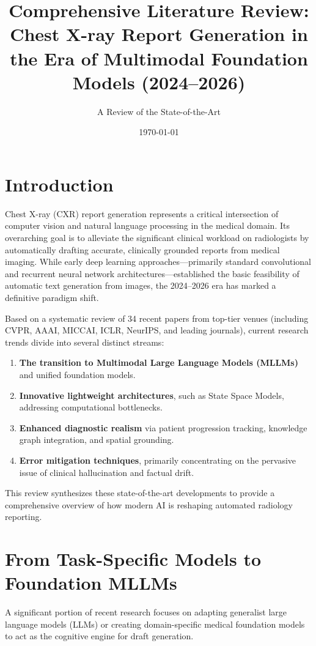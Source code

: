 \documentclass[11pt]{article}
\title{Comprehensive Literature Review: Chest X-ray Report Generation in the Era of Multimodal Foundation Models (2024--2026)}
\author{A Review of the State-of-the-Art}
\date{\today}
\begin{document}
\maketitle

\section{Introduction}

Chest X-ray (CXR) report generation represents a critical intersection of computer vision and natural language processing in the medical domain. Its overarching goal is to alleviate the significant clinical workload on radiologists by automatically drafting accurate, clinically grounded reports from medical imaging. While early deep learning approaches---primarily standard convolutional and recurrent neural network architectures---established the basic feasibility of automatic text generation from images, the 2024--2026 era has marked a definitive paradigm shift.

Based on a systematic review of 34 recent papers from top-tier venues (including CVPR, AAAI, MICCAI, ICLR, NeurIPS, and leading journals), current research trends divide into several distinct streams:
\begin{enumerate}
    \item \textbf{The transition to Multimodal Large Language Models (MLLMs)} and unified foundation models.
    \item \textbf{Innovative lightweight architectures}, such as State Space Models, addressing computational bottlenecks.
    \item \textbf{Enhanced diagnostic realism} via patient progression tracking, knowledge graph integration, and spatial grounding.
    \item \textbf{Error mitigation techniques}, primarily concentrating on the pervasive issue of clinical hallucination and factual drift.
\end{enumerate}

This review synthesizes these state-of-the-art developments to provide a comprehensive overview of how modern AI is reshaping automated radiology reporting.

\section{From Task-Specific Models to Foundation MLLMs}

A significant portion of recent research focuses on adapting generalist large language models (LLMs) or creating domain-specific medical foundation models to act as the cognitive engine for draft generation. 
\end{document}
